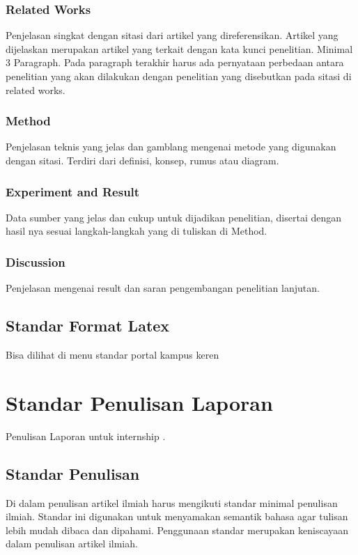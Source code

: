 \subsection{Related Works}
Penjelasan singkat dengan sitasi dari artikel yang direferensikan. Artikel yang dijelaskan merupakan artikel yang terkait dengan kata kunci penelitian. Minimal 3 Paragraph. Pada paragraph terakhir harus ada pernyataan perbedaan antara penelitian yang akan dilakukan dengan penelitian yang disebutkan pada sitasi di related works.

\subsection{Method}

Penjelasan teknis yang jelas dan gamblang mengenai metode yang digunakan dengan sitasi. Terdiri dari definisi, konsep, rumus atau diagram.

\subsection{Experiment and Result}
Data sumber yang jelas dan cukup untuk dijadikan penelitian, disertai dengan hasil nya sesuai langkah-langkah yang di tuliskan di Method.

\subsection{Discussion}
Penjelasan mengenai result dan saran pengembangan penelitian lanjutan.


\section{Standar Format Latex}
Bisa dilihat di menu standar portal kampus keren

\chapter{Standar Penulisan Laporan}

Penulisan Laporan untuk internship . 

\section{Standar Penulisan}
Di dalam penulisan artikel ilmiah harus mengikuti standar minimal penulisan ilmiah. Standar ini digunakan untuk menyamakan semantik bahasa agar tulisan lebih mudah dibaca dan dipahami. Penggunaan standar merupakan keniscayaan dalam penulisan artikel ilmiah.
